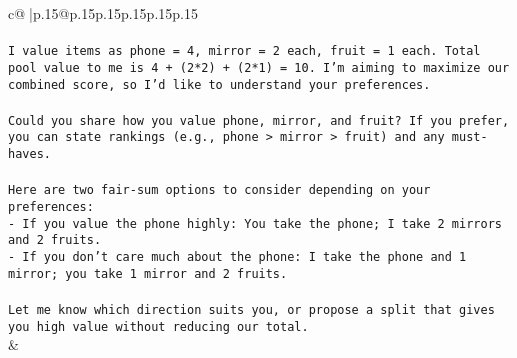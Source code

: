 \documentclass{article}
\begin{document}
{\begin{supertabular}{c@{$\;$}|p{.15\linewidth}@{}p{.15\linewidth}p{.15\linewidth}p{.15\linewidth}p{.15\linewidth}p{.15\linewidth}}
{{{\\ 
\\ 
\texttt{I value items as phone = 4, mirror = 2 each, fruit = 1 each. Total pool value to me is 4 + (2*2) + (2*1) = 10. I’m aiming to maximize our combined score, so I’d like to understand your preferences.} \\
\\ 
\texttt{Could you share how you value phone, mirror, and fruit? If you prefer, you can state rankings (e.g., phone > mirror > fruit) and any must{-}haves.} \\
\\ 
\texttt{Here are two fair{-}sum options to consider depending on your preferences:} \\
\texttt{{-} If you value the phone highly: You take the phone; I take 2 mirrors and 2 fruits.} \\
\texttt{{-} If you don’t care much about the phone: I take the phone and 1 mirror; you take 1 mirror and 2 fruits.} \\
\\ 
\texttt{Let me know which direction suits you, or propose a split that gives you high value without reducing our total.} \\
            }
        }
    }
    & \\ \\


\end{supertabular}}
\end{document}
